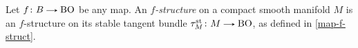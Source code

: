 \begin{definition}
  \label{mfd-f-struc}
  Let $f \c B \to \B\O$ be any map. An \emph{$f$-structure} on a
  compact smooth manifold $M$ is an $f$-structure on its stable
  tangent bundle $\tau^\st_M \c M \to \B\O$, as defined in
  \eqref{map-f-struct}.
\end{definition}






